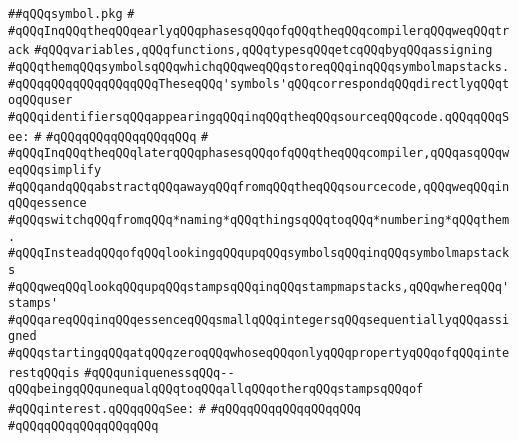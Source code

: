 \label{src/lib/compiler/front/basics/map/symbol.pkg}
\verb|##qQQqsymbol.pkg|\newline
\verb|#|\newline
\verb|#qQQqInqQQqtheqQQqearlyqQQqphasesqQQqofqQQqtheqQQqcompilerqQQqweqQQqtrack|\newline
\verb|#qQQqvariables,qQQqfunctions,qQQqtypesqQQqetcqQQqbyqQQqassigning|\newline
\verb|#qQQqthemqQQqsymbolsqQQqwhichqQQqweqQQqstoreqQQqinqQQqsymbolmapstacks.|\newline
\verb|#qQQqqQQqqQQqqQQqqQQqTheseqQQq'symbols'qQQqcorrespondqQQqdirectlyqQQqtoqQQquser|\newline
\verb|#qQQqidentifiersqQQqappearingqQQqinqQQqtheqQQqsourceqQQqcode.qQQqqQQqSee:|\newline
\verb|#|\newline
\verb|#qQQqqQQqqQQqqQQqqQQq|\newline
\verb|#|\newline
\verb|#qQQqInqQQqtheqQQqlaterqQQqphasesqQQqofqQQqtheqQQqcompiler,qQQqasqQQqweqQQqsimplify|\newline
\verb|#qQQqandqQQqabstractqQQqawayqQQqfromqQQqtheqQQqsourcecode,qQQqweqQQqinqQQqessence|\newline
\verb|#qQQqswitchqQQqfromqQQq*naming*qQQqthingsqQQqtoqQQq*numbering*qQQqthem.|\newline
\verb|#qQQqInsteadqQQqofqQQqlookingqQQqupqQQqsymbolsqQQqinqQQqsymbolmapstacks|\newline
\verb|#qQQqweqQQqlookqQQqupqQQqstampsqQQqinqQQqstampmapstacks,qQQqwhereqQQq'stamps'|\newline
\verb|#qQQqareqQQqinqQQqessenceqQQqsmallqQQqintegersqQQqsequentiallyqQQqassigned|\newline
\verb|#qQQqstartingqQQqatqQQqzeroqQQqwhoseqQQqonlyqQQqpropertyqQQqofqQQqinterestqQQqis|\newline
\verb|#qQQquniquenessqQQq--qQQqbeingqQQqunequalqQQqtoqQQqallqQQqotherqQQqstampsqQQqof|\newline
\verb|#qQQqinterest.qQQqqQQqSee:|\newline
\verb|#|\newline
\verb|#qQQqqQQqqQQqqQQqqQQq|\newline
\verb|#qQQqqQQqqQQqqQQqqQQq|\newline
